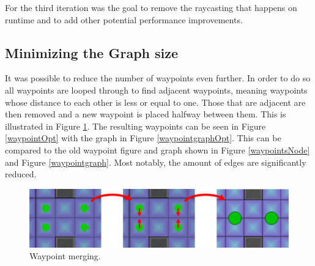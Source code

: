 For the third iteration was the goal to remove the raycasting that happens on runtime and to add other potential performance improvements.

\subsection*{Minimizing the Graph size}
It was possible to reduce the number of waypoints even further.
In order to do so all waypoints are looped through to find adjacent waypoints, meaning waypoints whose distance to each other is less or equal to one.
Those that are adjacent are then removed and a new waypoint is placed halfway between them.
This is illustrated in Figure \ref{waypointMerge}.
The resulting waypoints can be seen in Figure \ref{waypointOpt} with the graph in Figure \ref{waypointgraphOpt}. 
This can be compared to the old waypoint figure and graph shown in Figure \ref{waypointsNode} and Figure \ref{waypointgraph}.
Most notably, the amount of edges are significantly reduced.
\begin{figure}[H]
\begin{center}
	\includegraphics[width=\textwidth]{figures/astar/waypointMerge}
	\caption{Waypoint merging.}
	\label{waypointMerge}
\end{center}
\end{figure}

